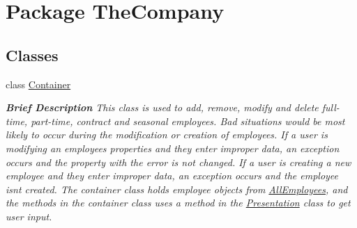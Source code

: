 \hypertarget{namespace_the_company}{}\section{Package The\+Company}
\label{namespace_the_company}
\subsection*{Classes}
\begin{DoxyCompactItemize}
\item 
class \hyperlink{class_the_company_1_1_container}{Container}
\begin{DoxyCompactList}\small\item\em {\bfseries Brief Description} This class is used to add, remove, modify and delete full-\/time, part-\/time, contract and seasonal employees. Bad situations would be most likely to occur during the modification or creation of employees. If a user is modifying an employee\textquotesingle{}s properties and they enter improper data, an exception occurs and the property with the error is not changed. If a user is creating a new employee and they enter improper data, an exception occurs and the employee isn\textquotesingle{}t created. The container class holds employee objects from \hyperlink{namespace_all_employees}{All\+Employees}, and the methods in the container class uses a method in the \hyperlink{namespace_presentation}{Presentation} class to get user input. \end{DoxyCompactList}\end{DoxyCompactItemize}
